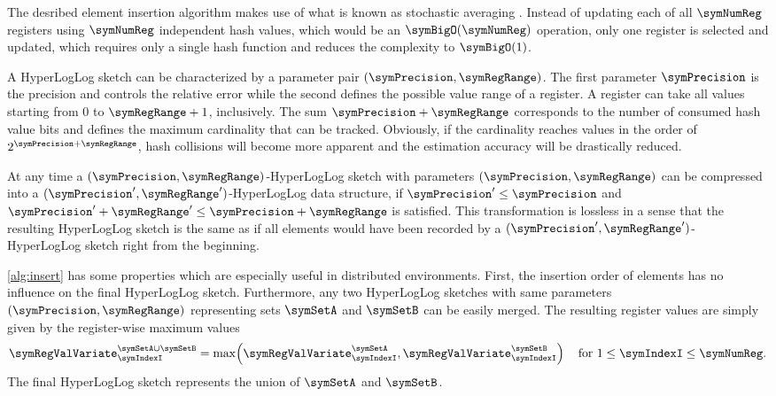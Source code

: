 \documentclass[a4paper]{scrartcl}
\begin{document}
The desribed element insertion algorithm makes use of what is known as stochastic averaging \cite{Flajolet1985}. Instead of updating each of all $\symNumReg$ registers using $\symNumReg$ independent hash values, which would be an $\symBigO(\symNumReg)$ operation, only one register is selected and updated, which requires only a single hash function and reduces the complexity to $\symBigO(1)$.

A HyperLogLog sketch can be characterized by a parameter pair $(\symPrecision, \symRegRange)$. The first parameter $\symPrecision$ is the precision and controls the relative error while the second defines the possible value range of a register. A register can take all values starting from 0 to $\symRegRange+1$, inclusively. The sum $\symPrecision+\symRegRange$ corresponds to the number of consumed hash value bits and defines the maximum cardinality that can be tracked. Obviously, if the cardinality reaches values in the order of $2^{\symPrecision+\symRegRange}$, hash collisions will become more apparent and the estimation accuracy will be drastically reduced.

At any time a $(\symPrecision, \symRegRange)$-HyperLogLog sketch with parameters $(\symPrecision, \symRegRange)$ can be compressed into a $(\symPrecision', \symRegRange')$-HyperLogLog data structure, if $\symPrecision'\leq\symPrecision$ and $\symPrecision'+\symRegRange' \leq\symPrecision + \symRegRange$ is satisfied. This transformation is lossless in a sense that the resulting HyperLogLog sketch is the same as if all elements would have been recorded by a $(\symPrecision', \symRegRange')$-HyperLogLog sketch right from the beginning.

\cref{alg:insert} has some properties which are especially useful in distributed environments. First, the insertion order of elements has no influence on the final HyperLogLog sketch. Furthermore, any two HyperLogLog sketches with same parameters $(\symPrecision, \symRegRange)$ representing  sets $\symSetA$ and $\symSetB$ can be easily merged. The resulting register values are simply given by the register-wise maximum values
\begin{equation}
\label{equ:hll_union}
\symRegValVariate^{\symSetA\cup\symSetB}_{\symIndexI} = 
\max
\!
\left(
\symRegValVariate^{\symSetA}_{\symIndexI},
\symRegValVariate^{\symSetB}_{\symIndexI}
\right)
\quad
\text{for $1\leq\symIndexI\leq\symNumReg$}.
\end{equation}
The final HyperLogLog sketch represents the union of $\symSetA$ and $\symSetB$.
\end{document}
